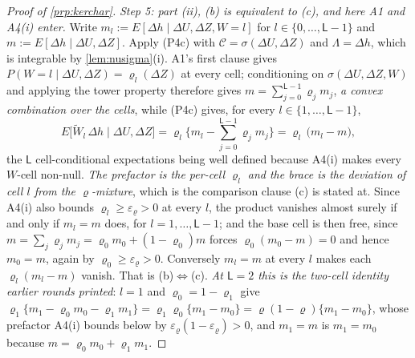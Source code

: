\begin{proof}[Proof of \cref{prp:kerchar}]
\emph{Step 5: part (ii), (b) is equivalent to (c), and here A1 and A4(i) enter.}
Write $m_l:=E[\Delta h\mid\Delta U,\Delta Z,W=l]$ for $l\in\{0,\dots,\mathsf L-1\}$ and
$m:=E[\Delta h\mid\Delta U,\Delta Z]$. Apply (P4c) with $\mathcal C=\sigma(\Delta U,\Delta Z)$ and
$\Lambda=\Delta h$, which is integrable by \cref{lem:nusigma}(i). A1's first clause gives
$P(W=l\mid\Delta U,\Delta Z)=\varrho_l(\Delta Z)$ at every cell; conditioning on
$\sigma(\Delta U,\Delta Z,W)$ and applying the tower property therefore gives
$m=\sum_{j=0}^{\mathsf L-1}\varrho_jm_j$, \emph{a convex combination over the cells}, while (P4c) gives,
for every $l\in\{1,\dots,\mathsf L-1\}$,
\[
E\big[\widetilde W_l\,\Delta h\mid\Delta U,\Delta Z\big]
=\varrho_l\Big\{m_l-\sum_{j=0}^{\mathsf L-1}\varrho_jm_j\Big\}
=\varrho_l\,\big(m_l-m\big),
\]
the $\mathsf L$ cell-conditional expectations being well defined because A4(i) makes every $W$-cell
non-null. \emph{The prefactor is the per-cell $\varrho_l$ and the brace is the deviation of cell $l$ from
the $\varrho$-mixture}, which is the comparison clause (c) is stated at. Since A4(i) also bounds
$\varrho_l\ge\varepsilon_\varrho>0$ at every $l$, the product vanishes almost surely if and only if
$m_l=m$ does, for $l=1,\dots,\mathsf L-1$; and the base cell is then free, since
$m=\sum_j\varrho_jm_j=\varrho_0m_0+(1-\varrho_0)m$ forces $\varrho_0(m_0-m)=0$ and hence $m_0=m$, again by
$\varrho_0\ge\varepsilon_\varrho>0$. Conversely $m_l=m$ at every $l$ makes each $\varrho_l(m_l-m)$
vanish. That is (b)$\Leftrightarrow$(c).
\emph{At $\mathsf L=2$ this is the two-cell identity earlier rounds printed}: $l=1$ and
$\varrho_0=1-\varrho_1$ give
$\varrho_1\{m_1-\varrho_0m_0-\varrho_1m_1\}=\varrho_1\varrho_0\{m_1-m_0\}=\varrho(1-\varrho)\{m_1-m_0\}$,
whose prefactor A4(i) bounds below by $\varepsilon_\varrho(1-\varepsilon_\varrho)>0$, and $m_1=m$ is
$m_1=m_0$ because $m=\varrho_0m_0+\varrho_1m_1$.
\end{proof}

